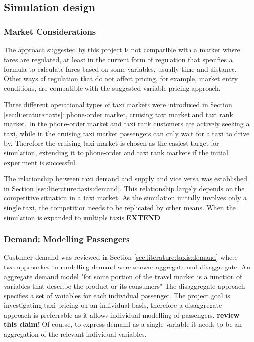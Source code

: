 \subsection{Simulation design}
\label{sec:design:simulation}

\subsubsection{Market Considerations}

The approach suggested by this project is not compatible with a market where
fares are regulated, at least in the current form of regulation that specifies
a formula to calculate fares based on some variables, usually time and
distance. Other ways of regulation that do not affect pricing, for example,
market entry conditions, are compatible with the suggested variable pricing
approach.

Three different operational types of taxi markets were introduced in Section
\ref{sec:literature:taxis}: phone-order market, cruising taxi market and taxi
rank market. In the phone-order market and taxi rank customers are actively
seeking a taxi, while in the cruising taxi market passengers can only wait for
a taxi to drive by. Therefore the cruising taxi market is chosen as the easiest
target for simulation, extending it to phone-order and taxi rank markets if the
initial experiment is successful.

The relationship between taxi demand and supply and vice versa was established
in Section \ref{sec:literature:taxis:demand}. This relationship largely depends
on the competitive situation in a taxi market. As the simulation initially
involves only a single taxi, the competition needs to be replicated by other
means. When the simulation is expanded to multiple taxis \textbf{EXTEND}


\subsubsection{Demand: Modelling Passengers}
\label{sec:design:passenger}

Customer demand was reviewed in Section \ref{sec:literature:taxis:demand} where
two approaches to modelling demand were shown: aggregate and disaggregate. An
aggregate demand model "for some portion of the travel market is a function of
variables that describe the product or its consumers"
\parencite{Small2007taxi+urban} The disaggregate approach specifies a set of
variables for each individual passenger. The project goal is investigating taxi
pricing on an individual basis, therefore a disaggregate approach is
preferrable as it allows individual modelling of passengers. \textbf{review
this claim!} Of course, to express demand as a single variable it needs to be
an aggregation of the relevant individual variables.

